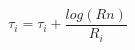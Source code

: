 \documentclass[12pt]{article}
\begin{document}
$$ 
  \tau_{i} = \tau_{i} + \frac{log(Rn)}{R_{i}}
$$
\end{document}
